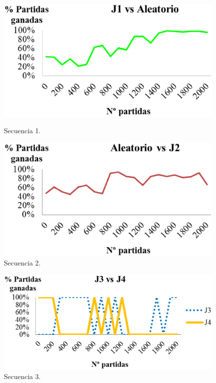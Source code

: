 \begin{figure}[t]
	\centering
	\begin{minipage}[t]{0.4\linewidth}
		\centering
		\includegraphics[scale=0.3]{contenido/cap7/imagenes/entrenamientoSecuencia1.eps}
		\caption[Secuencia de entrenamiento 1]{Secuencia 1.}
		\label{fig:secuencia1}
	\end{minipage}
	\hspace{1cm}
	\begin{minipage}[t]{0.4\linewidth}
		\centering
		\includegraphics[scale=0.3]{contenido/cap7/imagenes/entrenamientoSecuencia2.eps}
		\caption[Secuencia de entrenamiento 2]{Secuencia 2.}
		\label{fig:secuencia2}
	\end{minipage}
\end{figure}

\begin{figure}[t]
	\centering
	\includegraphics[scale=0.3]{contenido/cap7/imagenes/entrenamientoSecuencia3.eps}
	\caption[Secuencia de entrenamiento 3]{Secuencia 3.}
	\label{fig:secuencia3}
\end{figure} 

